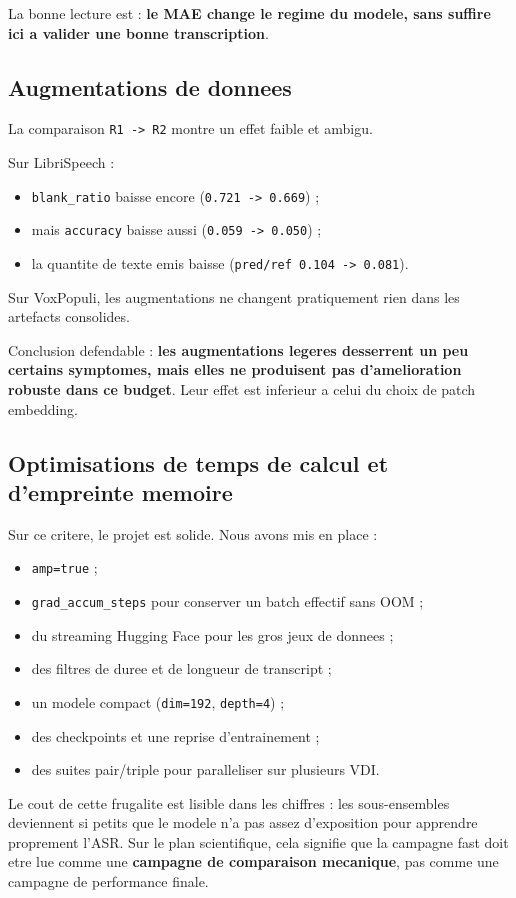 \documentclass[11pt,a4paper]{article}
\begin{document}
La bonne lecture est : \textbf{le MAE change le regime du modele, sans suffire ici a valider une bonne transcription}.

\subsection{Augmentations de donnees}
La comparaison \texttt{R1 -> R2} montre un effet faible et ambigu.

Sur LibriSpeech :
\begin{itemize}[leftmargin=1.2cm]
\item \texttt{blank\_ratio} baisse encore (\texttt{0.721 -> 0.669}) ;
\item mais \texttt{accuracy} baisse aussi (\texttt{0.059 -> 0.050}) ;
\item la quantite de texte emis baisse (\texttt{pred/ref 0.104 -> 0.081}).
\end{itemize}

Sur VoxPopuli, les augmentations ne changent pratiquement rien dans les artefacts consolides.

Conclusion defendable : \textbf{les augmentations legeres desserrent un peu certains symptomes, mais elles ne produisent pas d'amelioration robuste dans ce budget}. Leur effet est inferieur a celui du choix de patch embedding.

\subsection{Optimisations de temps de calcul et d'empreinte memoire}
Sur ce critere, le projet est solide. Nous avons mis en place :
\begin{itemize}[leftmargin=1.2cm]
\item \texttt{amp=true} ;
\item \texttt{grad\_accum\_steps} pour conserver un batch effectif sans OOM ;
\item du streaming Hugging Face pour les gros jeux de donnees ;
\item des filtres de duree et de longueur de transcript ;
\item un modele compact (\texttt{dim=192}, \texttt{depth=4}) ;
\item des checkpoints et une reprise d'entrainement ;
\item des suites pair/triple pour paralleliser sur plusieurs VDI.
\end{itemize}

Le cout de cette frugalite est lisible dans les chiffres : les sous-ensembles deviennent si petits que le modele n'a pas assez d'exposition pour apprendre proprement l'ASR. Sur le plan scientifique, cela signifie que la campagne fast doit etre lue comme une \textbf{campagne de comparaison mecanique}, pas comme une campagne de performance finale.
\end{document}
